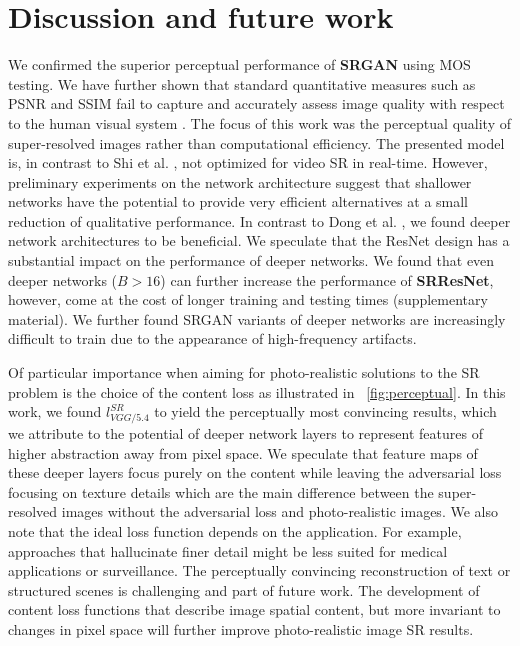 \documentclass[10pt,twocolumn,letterpaper]{article}
\begin{document}
\section{Discussion and future work}
\label{sec:discussion}
We confirmed the superior perceptual performance of \textbf{SRGAN} using \ac{MOS} testing. We have further shown that standard quantitative measures such as PSNR and SSIM fail to capture and accurately assess image quality with respect to the human visual system \cite{Toderici2016}. 
The focus of this work was the perceptual quality of super-resolved images rather than computational efficiency. The presented model is, in contrast to Shi et al. \cite{Shi2016ESPCN}, not optimized for video \ac{SR} in real-time. However, preliminary experiments on the network architecture suggest that shallower networks have the potential to provide very efficient alternatives at a small reduction of qualitative performance. %
In contrast to Dong et al. \cite{dong2016image}, we found deeper network architectures to be beneficial. We speculate that the \ac{ResNet} design has a substantial impact on the performance of deeper networks. We found that even deeper  networks ($B>16$) can further increase the performance of \textbf{SRResNet}, however, come at the cost of longer training and testing times (\cf supplementary material). We further found \ac{SRGAN} variants of deeper networks are increasingly difficult to train due to the appearance of high-frequency artifacts. 

Of particular importance when aiming for photo-realistic solutions to the \ac{SR} problem is the choice of the content loss as illustrated in \figurename~\ref{fig:perceptual}. In this work, we found $l^{SR}_{VGG/5.4}$ to yield the perceptually most convincing results, which we attribute to the potential of deeper network layers to represent features of higher abstraction \cite{zeiler2014visualizing,Yosinski2015,Mahendran2016} away from pixel space. We speculate that feature maps of these deeper layers focus purely on the content while leaving the adversarial loss focusing on texture details which are the main difference between the super-resolved images without the adversarial loss and photo-realistic images.
We also note that the ideal loss function depends on the application. For example, approaches that hallucinate finer detail might be less suited for medical applications or surveillance. The perceptually convincing reconstruction of text or structured scenes \cite{Huang15selfexemplars} is challenging and part of future work.
The development of content loss functions that describe image spatial content, but more invariant to changes in pixel space will further improve photo-realistic image \ac{SR} results.
\end{document}
